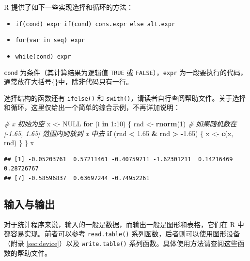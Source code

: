 \documentclass[
  b5paper,
  UTF8,twoside]{book}
\newenvironment{Shaded}{\begin{snugshade}}{\end{snugshade}}
\newcommand{\CommentTok}[1]{\textcolor[rgb]{0.56,0.35,0.01}{\textit{#1}}}
\newcommand{\ConstantTok}[1]{\textcolor[rgb]{0.56,0.35,0.01}{#1}}
\newcommand{\ControlFlowTok}[1]{\textcolor[rgb]{0.13,0.29,0.53}{\textbf{#1}}}
\newcommand{\DecValTok}[1]{\textcolor[rgb]{0.00,0.00,0.81}{#1}}
\newcommand{\FloatTok}[1]{\textcolor[rgb]{0.00,0.00,0.81}{#1}}
\newcommand{\FunctionTok}[1]{\textcolor[rgb]{0.13,0.29,0.53}{\textbf{#1}}}
\newcommand{\NormalTok}[1]{#1}
\newcommand{\OtherTok}[1]{\textcolor[rgb]{0.56,0.35,0.01}{#1}}
\newcommand{\SpecialCharTok}[1]{\textcolor[rgb]{0.81,0.36,0.00}{\textbf{#1}}}
\providecommand{\tightlist}{%
  \setlength{\itemsep}{0pt}\setlength{\parskip}{0pt}}
\begin{document}
R 提供了如下一些实现选择和循环的方法：

\begin{itemize}
\tightlist
\item
  \texttt{if(cond)\ expr\ if(cond)\ cons.expr\ else\ alt.expr}
\item
  \texttt{for(var\ in\ seq)\ expr}
\item
  \texttt{while(cond)\ expr}
\end{itemize}

\texttt{cond} 为条件（其计算结果为逻辑值 \texttt{TRUE} 或 \texttt{FALSE}），\texttt{expr} 为一段要执行的代码，通常放在大括号\{\}中，除非代码只有一行。

选择结构的函数还有 \texttt{ifelse()} 和 \texttt{swith()}，请读者自行查阅帮助文件。关于选择和循环，这里仅给出一个简单的综合示例，不再详加说明：

\begin{Shaded}
\begin{Highlighting}[]
\CommentTok{\# x 初始为空}
\NormalTok{x }\OtherTok{\textless{}{-}} \ConstantTok{NULL}
\ControlFlowTok{for}\NormalTok{ (i }\ControlFlowTok{in} \DecValTok{1}\SpecialCharTok{:}\DecValTok{10}\NormalTok{) \{}
\NormalTok{  rnd }\OtherTok{\textless{}{-}} \FunctionTok{rnorm}\NormalTok{(}\DecValTok{1}\NormalTok{)}
  \CommentTok{\# 如果随机数在 [{-}1.65, 1.65] 范围内则放到 x 中去}
  \ControlFlowTok{if}\NormalTok{ (rnd }\SpecialCharTok{\textless{}} \FloatTok{1.65} \SpecialCharTok{\&}\NormalTok{ rnd }\SpecialCharTok{\textgreater{}} \SpecialCharTok{{-}}\FloatTok{1.65}\NormalTok{) \{}
\NormalTok{    x }\OtherTok{\textless{}{-}} \FunctionTok{c}\NormalTok{(x, rnd)}
\NormalTok{  \}}
\NormalTok{\}}
\NormalTok{x}
\end{Highlighting}
\end{Shaded}

\begin{verbatim}
## [1] -0.05203761  0.57211461 -0.40759711 -1.62301211  0.14216469  0.28726767
## [7] -0.58596837  0.63697244 -0.74952261
\end{verbatim}

\subsection{输入与输出}\label{ux8f93ux5165ux4e0eux8f93ux51fa}

对于统计程序来说，输入的一般是数据，而输出一般是图形和表格，它们在 R 中都容易实现。前者可以参考 \texttt{read.table()} 系列函数，后者则可以使用图形设备（附录 \ref{sec:device}）以及 \texttt{write.table()} 系列函数。具体使用方法请查阅这些函数的帮助文件。
\end{document}
